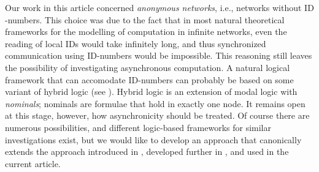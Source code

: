 \documentclass[copyright,creativecommons]{eptcs}
\begin{document}
Our work in this article concerned \emph{anonymous networks},
i.e., networks without $\mathrm{ID}$-numbers. This choice was due
to the fact that in most natural theoretical frameworks for the
modelling of computation in infinite networks,
even the reading of local $\mathrm{ID}$s would take infinitely long, and thus synchronized
communication using $\mathrm{ID}$-numbers would be impossible.
This reasoning still leaves the possibility of investigating asynchronous
computation. A natural logical framework that can accomodate 
$\mathrm{ID}$-numbers can probably be based on 
some variant of hybrid logic (see \cite{Areces}).
Hybrid logic is an extension of modal logic with \emph{nominals};
nominals are formulae that hold in exactly one node.
It remains open at this stage, however,
how asynchronicity should be treated.  Of course there are numerous possibilities, and
different logic-based frameworks for similar investigations exist,
but we would like to develop an approach that canonically
extends the approach introduced in \cite{hella,hella2}, developed further in \cite{kuusi},
and used in the current article.
































\nocite{*}


\end{document}
